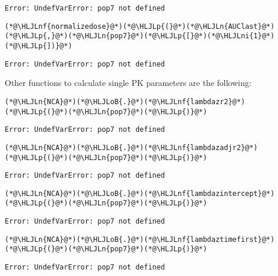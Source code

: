 \documentclass[12pt,a4paper]{article}
\newcommand{\HLJLn}[1]{#1}
\newcommand{\HLJLnf}[1]{\textcolor[RGB]{66,102,213}{#1}}
\newcommand{\HLJLni}[1]{\textcolor[RGB]{59,151,46}{#1}}
\newcommand{\HLJLoB}[1]{\textcolor[RGB]{102,102,102}{\textbf{#1}}}
\newcommand{\HLJLp}[1]{#1}
\begin{document}
\begin{lstlisting}
Error: UndefVarError: pop7 not defined
\end{lstlisting}


\begin{lstlisting}
(*@\HLJLnf{normalizedose}@*)(*@\HLJLp{(}@*)(*@\HLJLn{AUClast}@*)(*@\HLJLp{,}@*)(*@\HLJLn{pop7}@*)(*@\HLJLp{[}@*)(*@\HLJLni{1}@*)(*@\HLJLp{])}@*)
\end{lstlisting}

\begin{lstlisting}
Error: UndefVarError: pop7 not defined
\end{lstlisting}


Other functions to calculate single PK parameters are the following:


\begin{lstlisting}
(*@\HLJLn{NCA}@*)(*@\HLJLoB{.}@*)(*@\HLJLnf{lambdazr2}@*)(*@\HLJLp{(}@*)(*@\HLJLn{pop7}@*)(*@\HLJLp{)}@*)
\end{lstlisting}

\begin{lstlisting}
Error: UndefVarError: pop7 not defined
\end{lstlisting}


\begin{lstlisting}
(*@\HLJLn{NCA}@*)(*@\HLJLoB{.}@*)(*@\HLJLnf{lambdazadjr2}@*)(*@\HLJLp{(}@*)(*@\HLJLn{pop7}@*)(*@\HLJLp{)}@*)
\end{lstlisting}

\begin{lstlisting}
Error: UndefVarError: pop7 not defined
\end{lstlisting}


\begin{lstlisting}
(*@\HLJLn{NCA}@*)(*@\HLJLoB{.}@*)(*@\HLJLnf{lambdazintercept}@*)(*@\HLJLp{(}@*)(*@\HLJLn{pop7}@*)(*@\HLJLp{)}@*)
\end{lstlisting}

\begin{lstlisting}
Error: UndefVarError: pop7 not defined
\end{lstlisting}


\begin{lstlisting}
(*@\HLJLn{NCA}@*)(*@\HLJLoB{.}@*)(*@\HLJLnf{lambdaztimefirst}@*)(*@\HLJLp{(}@*)(*@\HLJLn{pop7}@*)(*@\HLJLp{)}@*)
\end{lstlisting}

\begin{lstlisting}
Error: UndefVarError: pop7 not defined
\end{lstlisting}
\end{document}
